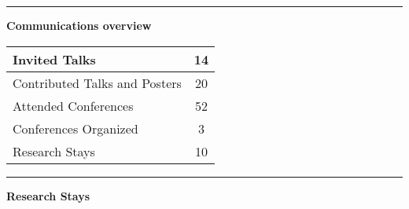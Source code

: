 \documentclass[a4paper]{article}
\newcommand{\block}[1]{\hrule \vspace{0.2cm} \textbf{\Large #1} \vspace{0.2cm}}
\begin{document}


    \block{Communications overview} 
    
    \begin{tabularx}{\linewidth}{|X|c|}
    \hline
    
    Invited Talks & 14 \\
    \hline
    
    Contributed Talks and Posters & 20 \\
    \hline
    
    Attended Conferences & 52 \\
    \hline
    
    Conferences Organized & 3 \\
    \hline
    
    Research Stays & 10 \\
    \hline
    
    \end{tabularx}
    \vspace{1em}



    \block{Research Stays}
\end{document}

